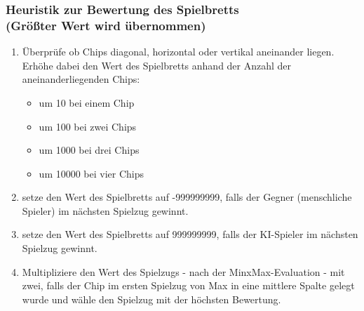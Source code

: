 
\begin{frame}
\frametitle{Heuristik zur Bewertung des Spielbretts \\ (Größter Wert wird übernommen)}

\begin{enumerate}
	\item Überprüfe ob Chips diagonal, horizontal oder vertikal aneinander liegen. Erhöhe dabei den Wert des Spielbretts anhand der Anzahl der aneinanderliegenden Chips:
	\begin{itemize}
		\item um 10 bei einem Chip
		\item um 100 bei zwei Chips
		\item um 1000 bei drei Chips
		\item um 10000 bei vier Chips
	\end{itemize}
	\item setze den Wert des Spielbretts auf -999999999, falls der Gegner (menschliche Spieler) im nächsten Spielzug gewinnt.
	\item setze den Wert des Spielbretts auf 999999999, falls der KI-Spieler im nächsten Spielzug gewinnt.
	\item Multipliziere den Wert des Spielzugs - nach der MinxMax-Evaluation - mit zwei, falls der Chip im ersten Spielzug von Max in eine mittlere Spalte gelegt wurde und wähle den Spielzug mit der höchsten Bewertung.
\end{enumerate}
\end{frame}




